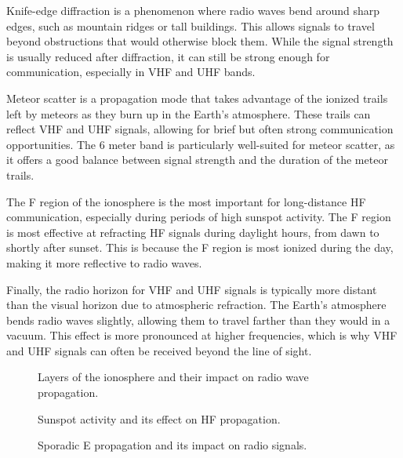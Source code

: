 Knife-edge diffraction is a phenomenon where radio waves bend around sharp edges, such as mountain ridges or tall buildings. This allows signals to travel beyond obstructions that would otherwise block them. While the signal strength is usually reduced after diffraction, it can still be strong enough for communication, especially in VHF and UHF bands.

Meteor scatter is a propagation mode that takes advantage of the ionized trails left by meteors as they burn up in the Earth's atmosphere. These trails can reflect VHF and UHF signals, allowing for brief but often strong communication opportunities. The 6 meter band is particularly well-suited for meteor scatter, as it offers a good balance between signal strength and the duration of the meteor trails.

The F region of the ionosphere is the most important for long-distance HF communication, especially during periods of high sunspot activity. The F region is most effective at refracting HF signals during daylight hours, from dawn to shortly after sunset. This is because the F region is most ionized during the day, making it more reflective to radio waves.

Finally, the radio horizon for VHF and UHF signals is typically more distant than the visual horizon due to atmospheric refraction. The Earth's atmosphere bends radio waves slightly, allowing them to travel farther than they would in a vacuum. This effect is more pronounced at higher frequencies, which is why VHF and UHF signals can often be received beyond the line of sight.

\begin{figure}[h]
    \centering
    \caption{Layers of the ionosphere and their impact on radio wave propagation.}
    \label{fig:ionosphere-layers}
\end{figure}

\begin{figure}[h]
    \centering
    \caption{Sunspot activity and its effect on HF propagation.}
    \label{fig:sunspot-activity}
\end{figure}

\begin{figure}[h]
    \centering
    \caption{Sporadic E propagation and its impact on radio signals.}
    \label{fig:sporadic-e}
\end{figure}

